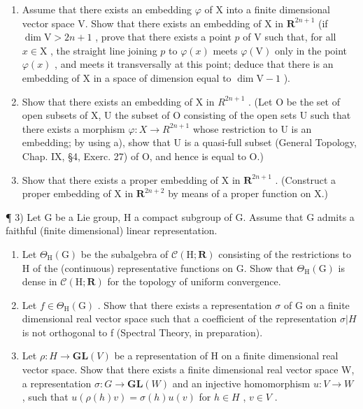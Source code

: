 \begin{enumerate}
\begin{enumerate}
\def\labelenumi{\alph{enumi})}
\item
  Assume that there exists an embedding \(\varphi\) of X into a finite dimensional vector space V. Show that there exists an embedding of X in \(\mathbf{R}^{2n + 1}\) (if \(\dim \mathrm{V} > 2n + 1\) , prove that there exists a point \(p\) of V such that, for all \(x \in \mathrm{X}\) , the straight line joining \(p\) to \(\varphi(x)\) meets \(\varphi(\mathrm{V})\) only in the point \(\varphi(x)\) , and meets it transversally at this point; deduce that there is an embedding of X in a space of dimension equal to \(\dim \mathrm{V} - 1\) ).
\item
  Show that there exists an embedding of X in \(R^{2n+1}\) . (Let O be the set of open subsets of X, U the subset of O consisting of the open sets U such that there exists a morphism \(\varphi: X \to R^{2n+1}\) whose restriction to U is an embedding; by using a), show that U is a quasi-full subset (General Topology, Chap. IX, §4, Exerc. 27) of O, and hence is equal to O.)
\item
  Show that there exists a proper embedding of X in \(\mathbf{R}^{2n + 1}\) . (Construct a proper embedding of X in \(\mathbf{R}^{2n + 2}\) by means of a proper function on X.)
\end{enumerate}

¶ 3) Let G be a Lie group, H a compact subgroup of G. Assume that G admits a faithful (finite dimensional) linear representation.

\begin{enumerate}
\def\labelenumi{\alph{enumi})}
\item
  Let \(\Theta_{\mathrm{H}}(\mathrm{G})\) be the subalgebra of \(\mathcal{C}(\mathrm{H};\mathbf{R})\) consisting of the restrictions to H of the (continuous) representative functions on G. Show that \(\Theta_{\mathrm{H}}(\mathrm{G})\) is dense in \(\mathcal{C}(\mathrm{H};\mathbf{R})\) for the topology of uniform convergence.
\item
  Let \(f \in \Theta_{\mathrm{H}}(\mathrm{G})\) . Show that there exists a representation \(\sigma\) of G on a finite dimensional real vector space such that a coefficient of the representation \(\sigma|H\) is not orthogonal to f (Spectral Theory, in preparation).
\item
  Let \(\rho:H\to\mathbf{GL}(V)\) be a representation of H on a finite dimensional real vector space. Show that there exists a finite dimensional real vector space W, a representation \(\sigma:G\to\mathbf{GL}(W)\) and an injective homomorphism \(u:V\to W\) , such that \(u(\rho(h)v)=\sigma(h)u(v)\) for \(h\in H\) , \(v\in V\) .
\end{enumerate}


\end{enumerate}
